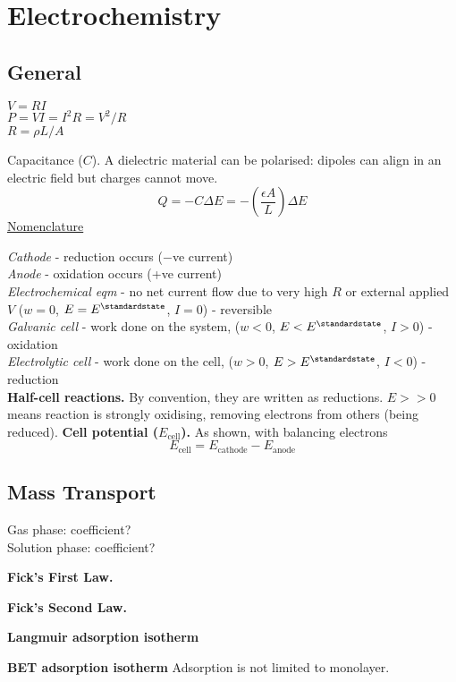 \pagebreak

\section{Electrochemistry}

\subsection*{General}
$V = RI$ \\
$P = VI = I^2R = V^2/R$ \\
$R = \rho L / A$

Capacitance ($C$). A dielectric material can be polarised: dipoles can align in an electric field
but charges cannot move.
$$Q = -C \Delta E = -\left(\frac{\epsilon A}{L}\right) \Delta E$$\underline{Nomenclature}

\textit{Cathode} - reduction occurs ($-$ve current)\\
\textit{Anode} - oxidation occurs  (+ve current)\\
\textit{Electrochemical eqm} - no net current flow due to very high $R$ or external applied $V$ ($w = 0$, $E = E^\standardstate$, $I = 0$) - reversible\\
\textit{Galvanic cell} - work done on the system, ($w < 0$, $E < E^\standardstate$, $I > 0$) - oxidation\\
\textit{Electrolytic cell} - work done on the cell, ($w > 0$, $E > E^\standardstate$, $I < 0$) - reduction\\
\textbf{Half-cell reactions.} By convention, they are written as reductions. $ E >> 0$
means reaction is strongly oxidising, removing electrons from others (being reduced).
\textbf{Cell potential ($E_{\mathrm{cell}}$).} As shown, with balancing electrons
\begin{equation*}
    E_{\mathrm{cell}} = E_{\mathrm{cathode}} - E_{\mathrm{anode}}
\end{equation*}
\subsection*{Mass Transport}

Gas phase: coefficient? \\
Solution phase: coefficient?

\textbf{Fick's First Law.}

\textbf{Fick's Second Law.}

\textbf{Langmuir adsorption isotherm}

\textbf{BET adsorption isotherm}
Adsorption is not limited to monolayer.

